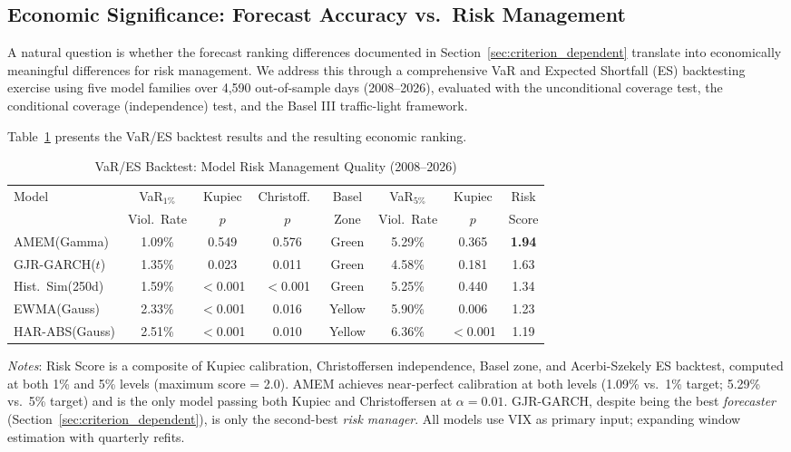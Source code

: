 \documentclass[12pt,a4paper]{article}
\begin{document}
\subsection{Economic Significance: Forecast Accuracy vs.\ Risk Management}
\label{sec:economic_significance}

A natural question is whether the forecast ranking differences documented in Section~\ref{sec:criterion_dependent} translate into economically meaningful differences for risk management. We address this through a comprehensive VaR and Expected Shortfall (ES) backtesting exercise using five model families over 4,590 out-of-sample days (2008--2026), evaluated with the \citet{kupiec1995} unconditional coverage test, the \citet{christoffersen1998} conditional coverage (independence) test, and the Basel III traffic-light framework.

Table~\ref{tab:var_backtest} presents the VaR/ES backtest results and the resulting economic ranking.

\begin{table}[H]
\centering
\small
\begin{threeparttable}
\caption{VaR/ES Backtest: Model Risk Management Quality (2008--2026)}
\label{tab:var_backtest}
\begin{tabular}{@{}lccccccc@{}}
\toprule
Model & VaR$_{1\%}$ & Kupiec & Christoff.\ & Basel & VaR$_{5\%}$ & Kupiec & Risk \\
 & Viol.\ Rate & $p$ & $p$ & Zone & Viol.\ Rate & $p$ & Score \\
\midrule
AMEM(Gamma) & 1.09\% & 0.549 & 0.576 & Green & 5.29\% & 0.365 & \textbf{1.94} \\
GJR-GARCH($t$) & 1.35\% & 0.023 & 0.011 & Green & 4.58\% & 0.181 & 1.63 \\
Hist.\ Sim(250d) & 1.59\% & $<$0.001 & $<$0.001 & Green & 5.25\% & 0.440 & 1.34 \\
EWMA(Gauss) & 2.33\% & $<$0.001 & 0.016 & Yellow & 5.90\% & 0.006 & 1.23 \\
HAR-ABS(Gauss) & 2.51\% & $<$0.001 & 0.010 & Yellow & 6.36\% & $<$0.001 & 1.19 \\
\bottomrule
\end{tabular}
\begin{tablenotes}
\small
\item \textit{Notes}: Risk Score is a composite of Kupiec calibration, Christoffersen independence, Basel zone, and Acerbi-Szekely ES backtest, computed at both 1\% and 5\% levels (maximum score = 2.0). AMEM achieves near-perfect calibration at both levels (1.09\% vs.\ 1\% target; 5.29\% vs.\ 5\% target) and is the only model passing both Kupiec and Christoffersen at $\alpha = 0.01$. GJR-GARCH, despite being the best \emph{forecaster} (Section~\ref{sec:criterion_dependent}), is only the second-best \emph{risk manager}. All models use VIX as primary input; expanding window estimation with quarterly refits.
\end{tablenotes}
\end{threeparttable}
\end{table}
\end{document}
